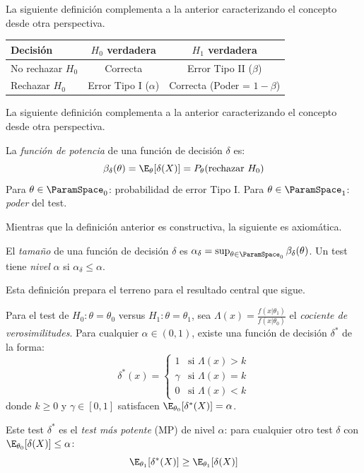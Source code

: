 La siguiente definición complementa a la anterior caracterizando el concepto desde otra perspectiva.

\begin{definition}
	\label{def:ch4-errores}
	\begin{center}
		\begin{tabular}{@{}lcc@{}}
			\toprule
			\textbf{Decisión} & $H_0$ verdadera         & $H_1$ verdadera              \\
			\midrule
			No rechazar $H_0$ & Correcta                & Error Tipo II ($\beta$)      \\
			Rechazar $H_0$    & Error Tipo I ($\alpha$) & Correcta (Poder = $1-\beta$) \\
			\bottomrule
		\end{tabular}
	\end{center}
\end{definition}

La siguiente definición complementa a la anterior caracterizando el concepto desde otra perspectiva.

\begin{definition}
	\label{def:ch4-potencia}
	La \emph{función de potencia} de una función de decisión $\delta$ es:
	\[
		\beta_\delta(\theta) = \E_\theta[\delta(X)] = P_\theta(\text{rechazar } H_0)
	\]
	Para $\theta \in \ParamSpace_0$: probabilidad de error Tipo I.
	Para $\theta \in \ParamSpace_1$: \emph{poder} del test.
\end{definition}

Mientras que la definición anterior es constructiva, la siguiente es axiomática.

\begin{definition}
	\label{def:ch4-tamano}
	El \emph{tamaño} de una función de decisión $\delta$ es $\alpha_\delta = \sup_{\theta \in \ParamSpace_0} \beta_\delta(\theta)$.
	Un test tiene \emph{nivel} $\alpha$ si $\alpha_\delta \leq \alpha$.
\end{definition}

Esta definición prepara el terreno para el resultado central que sigue.

\begin{theorem}
	\label{thm:ch4-neyman-pearson}
	Para el test de $H_0: \theta = \theta_0$ versus $H_1: \theta = \theta_1$,
	sea $\Lambda(x) = \frac{f(x|\theta_1)}{f(x|\theta_0)}$ el \emph{cociente
		de verosimilitudes}. Para cualquier $\alpha \in (0,1)$, existe una función
	de decisión $\delta^*$ de la forma:
	\[
		\delta^*(x) = \begin{cases}
			1      & \text{si } \Lambda(x) > k \\
			\gamma & \text{si } \Lambda(x) = k \\
			0      & \text{si } \Lambda(x) < k
		\end{cases}
	\]
	donde $k \geq 0$ y $\gamma \in [0,1]$ satisfacen
	$\E_{\theta_0}[\delta^*(X)] = \alpha$.

	Este test $\delta^*$ es el \emph{test más potente} (MP) de nivel $\alpha$:
	para cualquier otro test $\delta$ con $\E_{\theta_0}[\delta(X)] \leq \alpha$:
	\[
		\E_{\theta_1}[\delta^*(X)] \geq \E_{\theta_1}[\delta(X)]
	\]
\end{theorem}

